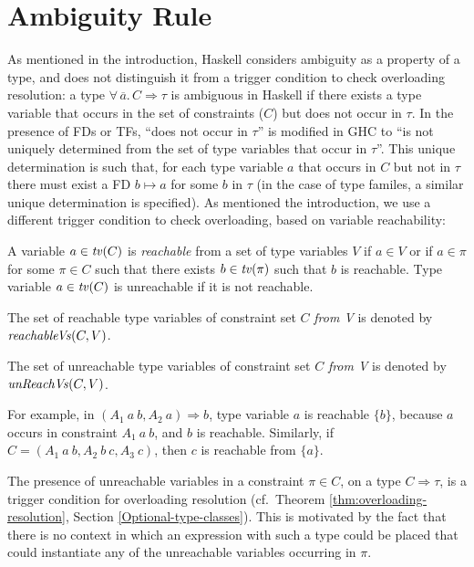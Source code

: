 \section{Ambiguity Rule}
\label{sec:ambiguity}

As mentioned in the introduction, Haskell considers ambiguity as a
property of a type, and does not distinguish it from a trigger
condition to check overloading resolution: a type
$\forall\,\overline{a}.\,C \Rightarrow \tau$ is ambiguous in Haskell
if there exists a type variable that occurs in the set of constraints
($C$) but does not occur in $\tau$.  In the presence of FDs or TFs,
``does not occur in $\tau$'' is modified in GHC to ``is not uniquely
determined from the set of type variables that occur in $\tau$''. This
unique determination is such that, for each type variable $a$ that
occurs in $C$ but not in $\tau$ there must exist a FD $b \mapsto a$
for some $b$ in $\tau$ (in the case of type familes, a similar unique
determination is specified). As mentioned the introduction, we use a
different trigger condition to check overloading, based on variable
reachability:

\begin{Definition}

A variable $a\in {\it tv\/}(C)$ is {\em reachable} from a set of type
variables $V$ if $a\in V$ or if $a\in \pi$ for some $\pi\in C$ such
that there exists $b\in {\it tv\/}(\pi)$ such that $b$ is reachable. Type
variable $a\in {\it tv\/}(C)$ is unreachable if it is not reachable.

The set of reachable type variables of constraint set $C$ {\em from
  V\/} is denoted by ${\it reachableVs\/}(C,V)$.

The set of unreachable type variables of constraint set $C$ {\em from
  V\/} is denoted by $\text{\it unReachVs\/}(C,V)$.

\label{def:reachable}
\end{Definition}

For example, in $(A_1\: a\: b, A_2\: a) \Rightarrow b$, type variable
$a$ is reachable $\{b\}$, because $a$ occurs in constraint $A_1\: a\:
b$, and $b$ is reachable. Similarly, if $C = (A_1\: a\: b, A_2\: b\:
c, A_3\: c)$, then $c$ is reachable from $\{a\}$.

The presence of unreachable variables in a constraint $\pi\in C$, on a
type $C \Rightarrow \tau$, is a trigger condition for overloading
resolution (cf.~Theorem \ref{thm:overloading-resolution}, Section
\ref{Optional-type-classes}). This is motivated by the fact that there
is no context in which an expression with such a type could be placed
that could instantiate any of the unreachable variables occurring in
$\pi$.

